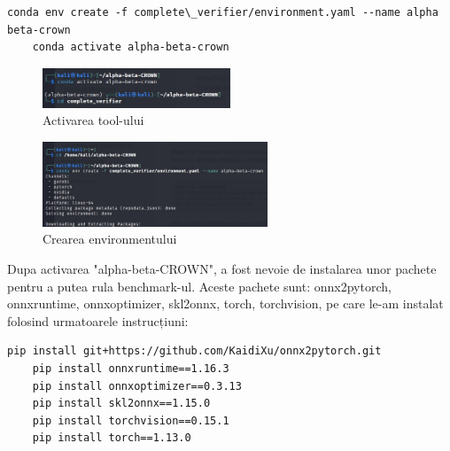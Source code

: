 \documentclass[12pt,a4paper]{article}
\theoremstyle{definition}
\theoremstyle{remark}
\begin{document}
\begin{lstlisting}[style=bashstyle]
    conda env create -f complete\_verifier/environment.yaml --name alpha beta-crown
    conda activate alpha-beta-crown
\end{lstlisting}
\begin{figure}[h!]
  \centering
    \includegraphics[width=0.5\textwidth]{linux2.jpg}
    \caption{Activarea tool-ului}
\end{figure}
\begin{figure}[h!]
  \centering
    \includegraphics[width=0.6\textwidth]{kali.jpg}
    \caption{Crearea environmentului}
\end{figure}

Dupa activarea "alpha-beta-CROWN", a fost nevoie de instalarea unor pachete pentru a putea rula benchmark-ul. Aceste pachete sunt: onnx2pytorch, onnxruntime, onnxoptimizer, skl2onnx, torch, torchvision, pe care le-am instalat folosind urmatoarele instrucțiuni:\par
\begin{lstlisting}[style=bashstyle]
    pip install git+https://github.com/KaidiXu/onnx2pytorch.git  
    pip install onnxruntime==1.16.3
    pip install onnxoptimizer==0.3.13
    pip install skl2onnx==1.15.0
    pip install torchvision==0.15.1
    pip install torch==1.13.0 
\end{lstlisting}
\end{document}
